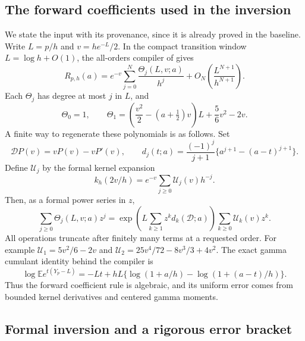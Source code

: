 \subsection{The forward coefficients used in the inversion}

We state the input with its provenance, since it is already proved in
the baseline. Write $L=p/h$ and $v=he^{-L}/2$. In the compact
transition window $L=\log h+O(1)$, the all-orders compiler of
\cite[, Theorem
\texttt{harmonic:thm:allorders}]{cont:ProveIt} gives
\begin{equation}\label{us:eq:forward}
 R_{p,h}(a)=e^{-v}
    \sum_{j=0}^N\frac{\Theta_j(L,v;a)}{h^j}
       +O_N\!\left(\frac{L^{N+1}}{h^{N+1}}\right).
\end{equation}
Each $\Theta_j$ has degree at most $j$ in $L$, and
\begin{equation}\label{us:eq:Theta1}
 \Theta_0=1,
 \qquad
 \Theta_1=\left(\frac{v^2}{2}-(a+\tfrac12)v\right)L
              +\frac56v^2-2v.
\end{equation}
A finite way to regenerate these polynomials is as follows. Set
\[
 \mathcal D P(v)=vP(v)-vP'(v),\qquad
 d_j(t;a)=\frac{(-1)^j}{j+1}
                \{a^{j+1}-(a-t)^{j+1}\}.
\]
Define $\mathcal U_j$ by the formal kernel expansion
\[
 k_h(2v/h)=e^{-v}\sum_{j\ge0}\mathcal U_j(v)h^{-j}.
\]
Then, as a formal power series in $z$,
\begin{equation}\label{us:eq:forward-recipe}
 \sum_{j\ge0}\Theta_j(L,v;a)z^j
 =\exp\!\left(L\sum_{k\ge1}z^k d_k(\mathcal D;a)\right)
       \sum_{k\ge0}\mathcal U_k(v)z^k.
\end{equation}
All operations truncate after finitely many terms at a requested
order. For example
$\mathcal U_1=5v^2/6-2v$ and
$\mathcal U_2=25v^4/72-8v^3/3+4v^2$.
The exact gamma cumulant identity behind the compiler is
\[
 \log\mathbb E e^{t(Y_p-L)}
 =-Lt+hL\{\log(1+a/h)-\log(1+(a-t)/h)\}.
\]
Thus the forward coefficient rule is algebraic, and its uniform
error comes from bounded kernel derivatives and centered gamma moments.

\subsection{Formal inversion and a rigorous error bracket}

